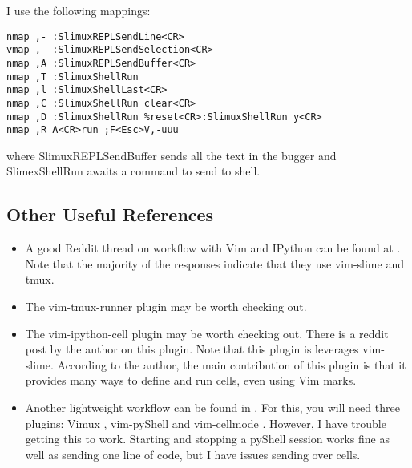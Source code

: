 \documentclass[10pt]{article}
\begin{document}
I use the following mappings:
\begin{lstlisting}
nmap ,- :SlimuxREPLSendLine<CR>
vmap ,- :SlimuxREPLSendSelection<CR>
nmap ,A :SlimuxREPLSendBuffer<CR>
nmap ,T :SlimuxShellRun 
nmap ,l :SlimuxShellLast<CR>
nmap ,C :SlimuxShellRun clear<CR>
nmap ,D :SlimuxShellRun %reset<CR>:SlimuxShellRun y<CR>
nmap ,R A<CR>run ;F<Esc>V,-uuu
\end{lstlisting}
where SlimuxREPLSendBuffer sends all the text in the bugger and SlimexShellRun awaits a command to send to shell.

\subsection{Other Useful References}
\begin{itemize}
    \item A good Reddit thread on workflow with Vim and IPython can be found at \cite{abdeljalil732020anyone}. Note
        that the majority of the responses indicate that they use vim-slime and tmux.
    \item The vim-tmux-runner plugin \cite{toomey2013tmuxrunner} may be worth checking out. 
    \item The vim-ipython-cell plugin \cite{hanschen2019ipython} may be worth checking out. There is a reddit post
        \cite{hanschen2019reddit} by the author on this plugin. Note that this plugin is leverages vim-slime. According
        to the author, the main contribution of this plugin is that it provides many ways to define and run cells, even
        using Vim marks.
    \item Another lightweight workflow can be found in \cite{hornung2019boosting}. For this, you will need three
        plugins: Vimux \cite{benmills2009vimux}, vim-pyShell \cite{hornung2019pyShell} and vim-cellmode
        \cite{julienr2016vimcellmode}. However, I have trouble getting this to work. Starting and stopping a pyShell
        session works fine as well as sending one line of code, but I have issues sending over cells.
\end{itemize}


\nocite{*}


\end{document}
